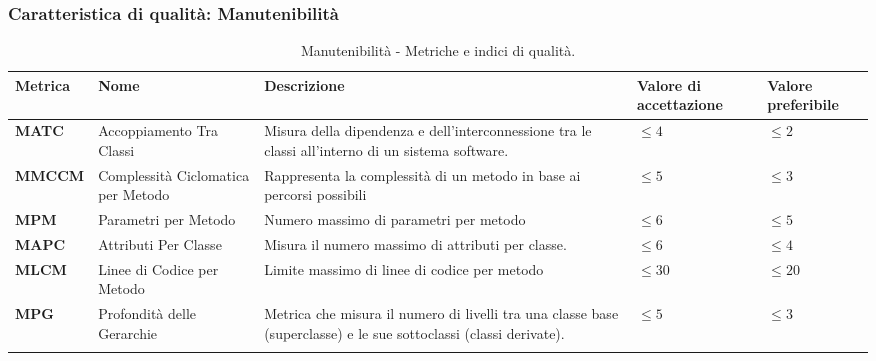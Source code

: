 \subsubsection{Caratteristica di qualità: Manutenibilità}
\hspace{1pt}
    \begin{longtable}{|C{1.8cm}|L{3cm}|L{4cm}|L{2.5cm}|L{2.5cm}|}
                \hline
                \textbf{Metrica} & \textbf{Nome} & \textbf{Descrizione} & \textbf{Valore di accettazione} & \textbf{Valore preferibile} \\
                \hline
                \textbf{MATC} & Accoppiamento Tra Classi &   Misura della dipendenza e dell'interconnessione tra le classi all'interno di un sistema software.   & $\leq 4$  & $\leq 2$ \\
                \hline
                \textbf{MMCCM} & Complessità Ciclomatica per Metodo & Rappresenta la complessità di un metodo in base ai percorsi possibili & $\leq 5$ & $\leq 3$ \\
                \hline
                \textbf{MPM} & Parametri per Metodo & Numero massimo di parametri per metodo & $\leq 6$ & $\leq 5$ \\
                \hline
                \textbf{MAPC} & Attributi Per Classe & Misura il numero massimo di attributi per classe. & $\leq 6$ & $\leq 4$ \\
                \hline
                 \textbf{MLCM} & Linee di Codice per Metodo & Limite massimo di linee di codice per metodo & $\leq 30$ & $\leq 20$ \\
                \hline
                \textbf{MPG} & Profondità delle Gerarchie & Metrica che misura il numero di livelli tra una classe base (superclasse) e le sue sottoclassi (classi derivate). & $\leq 5$  & $\leq 3$ \\
                \hline
                \caption{Manutenibilità - Metriche e indici di qualità.}
        \label{tab:metriche_manutenibilità_testo}
    \end{longtable}


